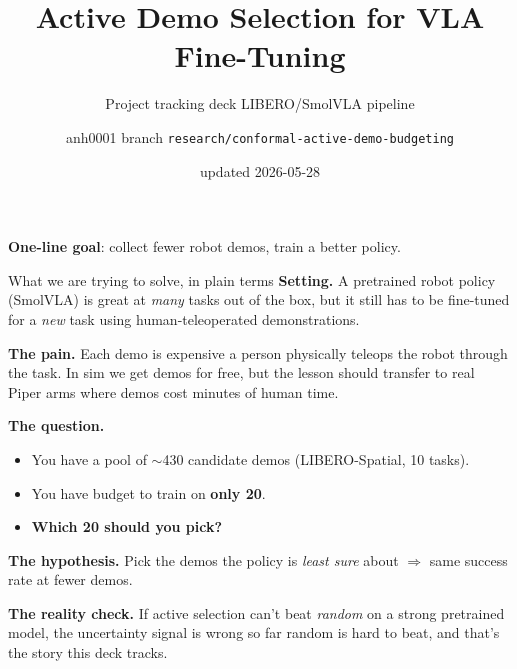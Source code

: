\documentclass[aspectratio=169]{beamer}
\title{Active Demo Selection for VLA Fine-Tuning}
\subtitle{Project tracking deck \textemdash{} LIBERO/SmolVLA pipeline}
\author{anh0001 \quad\muted{\textbar}\quad branch \texttt{research/conformal-active-demo-budgeting}}
\date{updated 2026-05-28}
\begin{document}
\begin{frame}
\titlepage
\centering
\textbf{One-line goal}: collect fewer robot demos, train a better policy.
\end{frame}

\begin{frame}{What we are trying to solve, in plain terms}
\textbf{Setting.} A pretrained robot policy (SmolVLA) is great at \emph{many} tasks out of the box, but it still has to be fine-tuned for a \emph{new} task using human-teleoperated demonstrations.
\vspace{0.4em}

\textbf{The pain.} Each demo is expensive \textemdash{} a person physically teleops the robot through the task. In sim we get demos for free, but the lesson should transfer to real Piper arms where demos cost minutes of human time.
\vspace{0.4em}

\textbf{The question.}
\begin{itemize}
  \item You have a pool of $\sim$430 candidate demos (LIBERO-Spatial, 10 tasks).
  \item You have budget to train on \textbf{only 20}.
  \item \textbf{Which 20 should you pick?}
\end{itemize}
\vspace{0.3em}

\textbf{The hypothesis.} Pick the demos the policy is \emph{least sure} about $\Rightarrow$ same success rate at fewer demos.
\vspace{0.3em}

\textbf{The reality check.} If active selection can't beat \emph{random} on a strong pretrained model, the uncertainty signal is wrong \textemdash{} so far random is hard to beat, and that's the story this deck tracks.
\end{frame}
\end{document}
